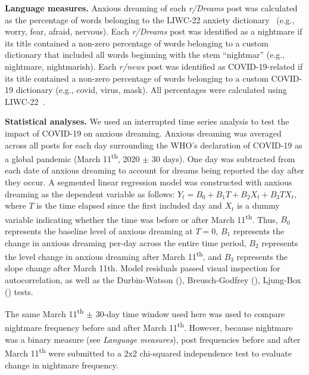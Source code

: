 \documentclass[11pt,a4paper,twocolumn]{article}
\begin{document}
\bigskip
\noindent
\textbf{Language measures.} Anxious dreaming of each \textit{r/Dreams} post was calculated as the percentage of words belonging to the LIWC-22 anxiety dictionary~\supercite{boyd2022development} (e.g., worry, fear, afraid, nervous). Each \textit{r/Dreams} post was identified as a nightmare if its title contained a non-zero percentage of words belonging to a custom dictionary that included all words beginning with the stem ``nightmar'' (e.g., nightmare, nightmarish). Each \textit{r/news} post was identified as COVID-19-related if its title contained a non-zero percentage of words belonging to a custom COVID-19 dictionary (e.g., covid, virus, mask). All percentages were calculated using LIWC-22~\supercite{boyd2022development}.

\bigskip
\noindent
\textbf{Statistical analyses.} We used an interrupted time series analysis to test the impact of COVID-19 on anxious dreaming. Anxious dreaming was averaged across all posts for each day surrounding the WHO's declaration of COVID-19 as a global pandemic (March 11\textsuperscript{th}, 2020 $\pm$ 30 days). One day was subtracted from each date of anxious dreaming to account for dreams being reported the day after they occur. A segmented linear regression model was constructed with anxious dreaming as the dependent variable as follows: $Y_t = B_0 + B_1 T + B_2 X_t + B_3 T X_t$, where $T$ is the time elapsed since the first included day and $X_t$ is a dummy variable indicating whether the time was before or after March 11\textsuperscript{th}. Thus, $B_0$ represents the baseline level of anxious dreaming at $T=0$, $B_1$ represents the change in anxious dreaming per-day across the entire time period, $B_2$ represents the level change in anxious dreaming after March 11\textsuperscript{th}, and $B_3$ represents the slope change after March 11th. Model residuals passed visual inspection for autocorrelation, as well as the Durbin-Watson (\regrDurbinWatson), Breusch-Godfrey (\regrBreuschGodfrey), Ljung-Box (\regrLjungBox) tests.

\par
The same March 11\textsuperscript{th} $\pm$ 30-day time window used here was used to compare nightmare frequency before and after March 11\textsuperscript{th}. However, because nightmare was a binary measure (see \textit{Language measures}), post frequencies before and after March 11\textsuperscript{th} were submitted to a 2x2 chi-squared independence test to evaluate change in nightmare frequency.
\end{document}
